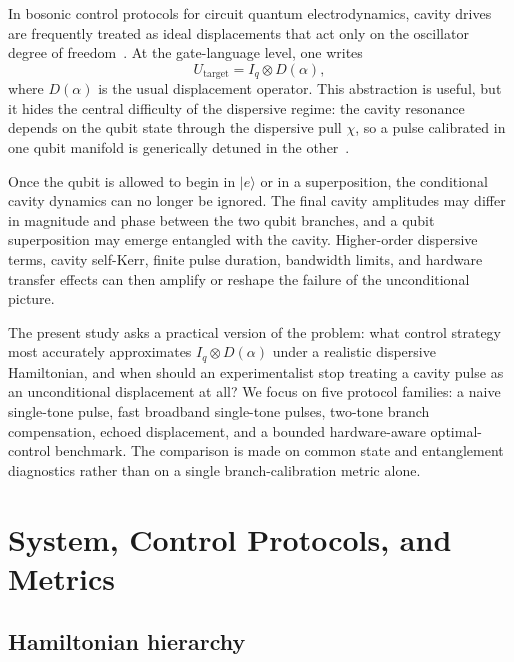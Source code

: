 \documentclass[aps,pra,twocolumn,reprint,floatfix,amsmath,amssymb]{revtex4-2}
\begin{document}
In bosonic control protocols for circuit quantum electrodynamics, cavity drives are frequently treated as ideal displacements that act only on the oscillator degree of freedom~\cite{blais2004cavity,blais2021circuit}. At the gate-language level, one writes
\begin{equation}
U_{\mathrm{target}} = I_q \otimes D(\alpha),
\end{equation}
where \(D(\alpha)\) is the usual displacement operator. This abstraction is useful, but it hides the central difficulty of the dispersive regime: the cavity resonance depends on the qubit state through the dispersive pull \(\chi\), so a pulse calibrated in one qubit manifold is generically detuned in the other~\cite{schuster2007resolving,nguyen2012dispersive}.

Once the qubit is allowed to begin in \(|e\rangle\) or in a superposition, the conditional cavity dynamics can no longer be ignored. The final cavity amplitudes may differ in magnitude and phase between the two qubit branches, and a qubit superposition may emerge entangled with the cavity. Higher-order dispersive terms, cavity self-Kerr, finite pulse duration, bandwidth limits, and hardware transfer effects can then amplify or reshape the failure of the unconditional picture.

The present study asks a practical version of the problem: what control strategy most accurately approximates \(I_q \otimes D(\alpha)\) under a realistic dispersive Hamiltonian, and when should an experimentalist stop treating a cavity pulse as an unconditional displacement at all? We focus on five protocol families: a naive single-tone pulse, fast broadband single-tone pulses, two-tone branch compensation, echoed displacement, and a bounded hardware-aware optimal-control benchmark. The comparison is made on common state and entanglement diagnostics rather than on a single branch-calibration metric alone.

\section{System, Control Protocols, and Metrics}
\label{sec:methods}

\subsection{Hamiltonian hierarchy}
\end{document}
